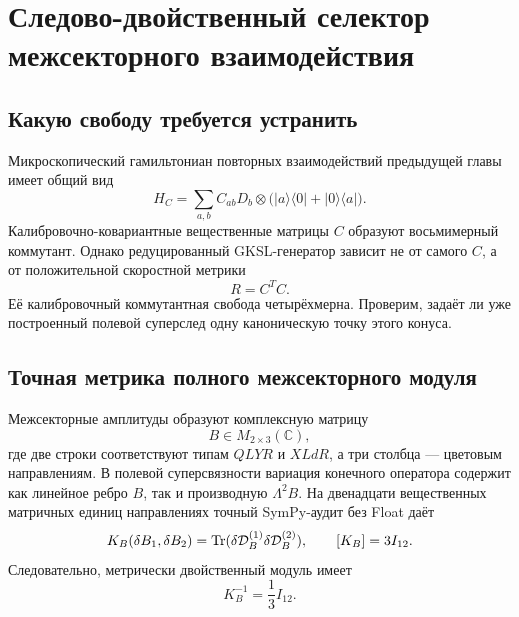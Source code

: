\chapter{Следово-двойственный селектор межсекторного взаимодействия}
\label{ch:v8-trace-dual-cross-interaction-selector-gate}

\section{Какую свободу требуется устранить}

Микроскопический гамильтониан повторных взаимодействий предыдущей главы имеет
общий вид
\begin{equation}
 H_C=\sum_{a,b}C_{ab}D_b\otimes
 \bigl(|a\rangle\langle0|+|0\rangle\langle a|\bigr).
 \label{eq:v8-general-cross-interaction-coupling}
\end{equation}
Калибровочно-ковариантные вещественные матрицы $C$ образуют восьмимерный
коммутант. Однако редуцированный GKSL-генератор зависит не от самого $C$,
а от положительной скоростной метрики
\begin{equation}
 R=C^TC.
 \label{eq:v8-cross-coupling-rate-metric}
\end{equation}
Её калибровочный коммутантная свобода четырёхмерна. Проверим, задаёт ли уже
построенный полевой суперслед одну каноническую точку этого конуса.

\section{Точная метрика полного межсекторного модуля}

Межсекторные амплитуды образуют комплексную матрицу
\begin{equation}
 B\in M_{2\times3}(\mathbb C),
\end{equation}
где две строки соответствуют типам $QLYR$ и $XLdR$, а три столбца ---
цветовым направлениям. В полевой суперсвязности вариация конечного
оператора содержит как линейное ребро $B$, так и производную
$\Lambda^2B$. На двенадцати вещественных матричных единиц направлениях точный
SymPy-аудит без Float даёт
\begin{equation}
 K_B(\delta B_1,\delta B_2)
 =\operatorname{Tr}(\delta\mathcal D_B^{(1)}\delta\mathcal D_B^{(2)}),
 \qquad
 [K_B]=3I_{12}.
 \label{eq:v8-exact-cross-field-trace-metric}
\end{equation}
Следовательно, метрически двойственный модуль имеет
\begin{equation}
 K_B^{-1}=\frac13I_{12}.
 \label{eq:v8-trace-dual-cross-rate-metric}
\end{equation}

